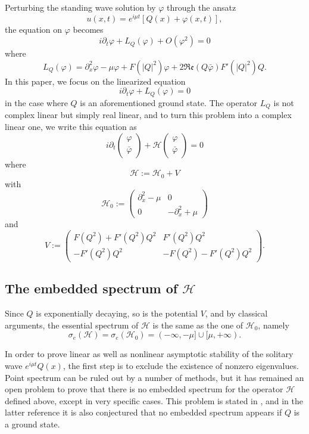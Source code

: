 \documentclass[11 pt]{amsart}
\theoremstyle{definition}
\theoremstyle{remark}
\numberwithin{equation}{section}
\begin{document}
Perturbing the standing wave solution by $\varphi$ through the ansatz
\[ u (x, t) = e^{i \mu t} \left[ Q (x) + \varphi (x, t) \right], \]
the equation on $\varphi$ becomes
\[ i \partial_t \varphi + L_Q (\varphi) + O (\varphi^2) = 0 \]
where
\[ L_Q (\varphi) = \partial_x^2 \varphi - \mu \varphi + F (| Q |^2) \varphi +
   2\mathfrak{R}\mathfrak{e} (Q \bar{\varphi}) F' (| Q |^2) Q. \]
In this paper, we focus on the linearized equation
\[ i \partial_t \varphi + L_Q (\varphi) = 0 \]
in the case where $Q$ is an aforementioned ground state. The operator $L_Q$ is not complex linear but
simply real linear, and to turn this problem into a complex linear one, we
write this equation as
\[ i \partial_t \left(\begin{array}{c}
     \varphi\\
     \bar{\varphi}
   \end{array}\right) +\mathcal{H} \left(\begin{array}{c}
     \varphi\\
     \bar{\varphi}
   \end{array}\right) = 0 \]
where
\[ \mathcal{H} := \mathcal{H}_0 + V \]
with
\[ \mathcal{H}_0 := \left(\begin{array}{cc}
     \partial_x^2 - \mu & 0\\
     0 & - \partial_x^2 + \mu
   \end{array}\right) \]
and
\begin{equation}
  V := \left(\begin{array}{cc}
    F (Q^2) + F' (Q^2) Q^2 & F' (Q^2) Q^2\\
    - F' (Q^2) Q^2 & -F (Q^2) - F' (Q^2) Q^2
  \end{array}\right) . \label{potV}
\end{equation}

\subsection{The embedded spectrum of $\mathcal{H}$}
Since $Q$ is exponentially decaying, so is the potential
$V$, and by classical arguments, the essential spectrum of $\mathcal{H}$
is the same as the one of $\mathcal{H}_0$, namely
\[ \sigma_e (\mathcal{H}) = \sigma_e (\mathcal{H}_0) = ( - \infty, - \mu] \cup
   [\mu, + \infty ). \]

In order to prove linear as well as nonlinear asymptotic stability of the solitary wave $e^{i\mu t} Q(x)$, the first step is to exclude the existence of nonzero eigenvalues. Point spectrum can be ruled out by a number of methods, but it has remained an open problem to prove that there is no embedded spectrum for the operator $\mathcal{H}$ defined above, except in very specific cases. This problem is stated in \cite{CGNT,ErdoganSchlag}, and in the latter reference it is also conjectured that no embedded spectrum appears if $Q$ is a ground state.
\end{document}
